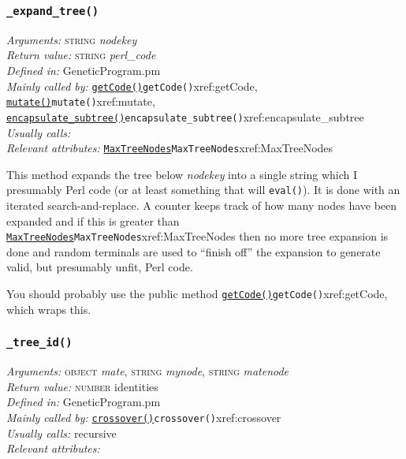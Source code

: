 \documentclass[a4paper]{article}
\begin{document}
\subsubsection{\texttt{\_expand\_tree()}}\label{xref:_expand_tree}
\begin{flushleft}
\textit{Arguments:} \textsc{string} \textit{nodekey}\\
\textit{Return value:} \textsc{string} \textit{perl\_code}\\
\textit{Defined in:} GeneticProgram.pm\\
\textit{Mainly called by:} \hyperref[no]{\texttt{getCode()}}{\texttt{getCode()}}{xref:getCode}, \hyperref[no]{\texttt{mutate()}}{\texttt{mutate()}}{xref:mutate}, \hyperref[no]{\texttt{encapsulate\_subtree()}}{\texttt{encapsulate\_subtree()}}{xref:encapsulate_subtree}\\
\textit{Usually calls:} \\
\textit{Relevant attributes:} \hyperref[no]{\texttt{MaxTreeNodes}}{\texttt{MaxTreeNodes}}{xref:MaxTreeNodes}
\end{flushleft}

This method expands the tree below \textit{nodekey} into a single
string which I presumably Perl code (or at least something that will
\texttt{eval()}). It is done with an iterated search-and-replace.  A
counter keeps track of how many nodes have been expanded and if this
is greater than \hyperref[no]{\texttt{MaxTreeNodes}}{\texttt{MaxTreeNodes}}{xref:MaxTreeNodes} then no more tree expansion is
done and random terminals are used to ``finish off'' the expansion to
generate valid, but presumably unfit, Perl code.

You should probably use the public method \hyperref[no]{\texttt{getCode()}}{\texttt{getCode()}}{xref:getCode},
which wraps this.

\subsubsection{\texttt{\_tree\_id()}}\label{xref:_tree_id}
\begin{flushleft}
\textit{Arguments:} \textsc{object} \textit{mate}, \textsc{string} \textit{mynode}, \textsc{string} \textit{matenode} \\
\textit{Return value:} \textsc{number} identities\\
\textit{Defined in:} GeneticProgram.pm\\
\textit{Mainly called by:} \hyperref[no]{\texttt{crossover()}}{\texttt{crossover()}}{xref:crossover}\\
\textit{Usually calls:} recursive\\
\textit{Relevant attributes:}
\end{flushleft}
\end{document}
